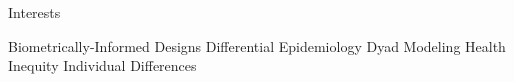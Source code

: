 \begin{rSection}{\textrm{Interests}} \begin{center}{\small Biometrically-Informed Designs \bigcdot Differential Epidemiology \bigcdot Dyad Modeling \bigcdot Health Inequity \bigcdot Individual Differences} \end{center}
\end{rSection}
